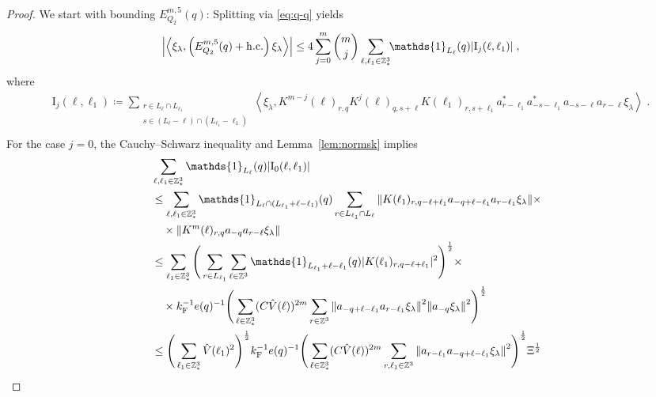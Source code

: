 \documentclass[12pt,a4paper]{article}
\numberwithin{equation}{section}
\newcommand{\1}{\mathbb{I}}
\newcommand{\F}{\mathrm{F}}
\newcommand{\I}{\mathrm{I}}
\newcommand{\Z}{\mathbb{Z}}
\newcommand{\half}{\frac{1}{2}}
\newcommand{\eva}[1]{\left\langle #1 \right\rangle}
\theoremstyle{plain}
\theoremstyle{definition}
\theoremstyle{remark}
\theoremstyle{plain}
\theoremstyle{definition}
\theoremstyle{remark}
\begin{document}
\begin{proof}
We start with bounding $ E^{m,5}_{Q_2}(q) $: Splitting via \eqref{eq:q-q} yields
\begin{equation} \label{eq:EQ2131}
\begin{aligned}
	& \abs{\eva{\xi_\lambda,\left(E^{m,5}_{Q_2}(q) +\mathrm{h.c.}\right) \xi_\lambda }}
	\le 4 \sum_{j=0}^m {{m}\choose j} \sum_{\ell,\ell_1  \in \Z^3_*}\!\! \mathds{1}_{L_\ell}(q) |\I_j(\ell, \ell_1)| \;,
	\end{aligned}
\end{equation}
where
\begin{equation}
\begin{aligned}
	& \I_j(\ell, \ell_1)
	\coloneq \sum_{\substack{r\in L_{\ell} \cap L_{\ell_1}\\ s \in (L_{\ell} - \ell) \cap (L_{\ell_1} - \ell_1)}}
		\eva{\xi_\lambda, K^{m-j}(\ell)_{r,q} K^{j}(\ell)_{q,s+\ell} K(\ell_1)_{r,s+\ell_1} a^*_{r-\ell_1} a^*_{-s-\ell_1} a_{-s-\ell} a_{r-\ell} \xi_\lambda} \;. \\
\end{aligned}
\end{equation}
For the case $ j = 0 $, the Cauchy--Schwarz inequality and Lemma~\ref{lem:normsk} implies
\begin{align}
	&\sum_{\ell,\ell_1 \in \Z^3_*} \mathds{1}_{L_\ell}(q) |\I_0(\ell, \ell_1)| \nonumber\\
	&\leq \sum_{\ell,\ell_1 \in \Z^3_*} \mathds{1}_{L_\ell \cap (L_{\ell_1}+\ell-\ell_1)}(q) \sum\limits_{r\in L_{\ell_1} \cap L_\ell}
		\norm{ K(\ell_1)_{r,q-\ell+\ell_1} a_{-q+\ell-\ell_1} a_{r-\ell_1} \xi_\lambda} \times \nonumber\\
	&\quad \times \norm{ K^m(\ell)_{r,q} a_{-q}a_{r-\ell} \xi_\lambda } \nonumber\\
	&\leq \sum_{\ell_1 \in \Z^3_*}
		\Bigg( \sum_{r\in L_{\ell_1}} \sum_{\ell \in \Z^3} \mathds{1}_{L_{\ell_1}+\ell-\ell_1}(q) |K(\ell_1)_{r,q-\ell+\ell_1}|^2 \Bigg)^{\half} \times \nonumber\\
	&\quad \times k_{\F}^{-1} e(q)^{-1} \Bigg( \sum_{\ell \in \Z^3_*} (C \hat{V}(\ell))^{2m} \sum_{r\in \Z^3} \norm{a_{-q+\ell-\ell_1} a_{r-\ell_1} \xi_\lambda}^2
		\norm{ a_{-q} \xi_\lambda }^2 \Bigg)^{\half} \nonumber\\
	&\leq \Bigg( \sum_{\ell_1 \in \Z^3_*} \hat{V}(\ell_1)^2 \Bigg)^{\half} k_{\F}^{-1} e(q)^{-1}
		\Bigg( \sum_{\ell \in \Z^3_*} (C \hat{V}(\ell))^{2m} \sum_{r,\ell_1 \in \Z^3} \norm{a_{r-\ell_1} a_{-q+\ell-\ell_1} \xi_\lambda}^2 \Bigg)^{\half} \Xi^{\half} \nonumber\\

\end{align}
\end{proof}
\end{document}
